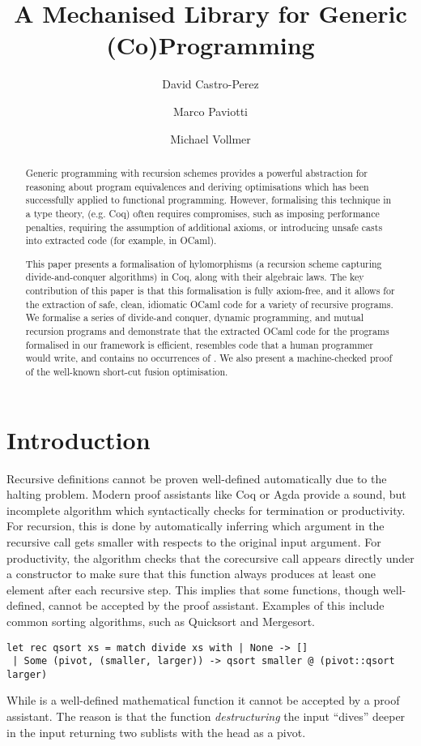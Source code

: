 \documentclass[anonymous, a4paper, UKenglish, cleveref, autoref, thm-restate]{lipics-v2021}
\title{A Mechanised Library for Generic (Co)Programming}
\author{David Castro-Perez}{School of Computing, University of Kent}{d-castro-perez@kent.ac.uk}{}{}
\author{Marco Paviotti}{School of Computing, University of Kent}{m.paviotti@kent.ac.uk}{}{}
\author{Michael Vollmer}{School of Computing, University of Kent}{m.vollmer@kent.ac.uk}{}{}
\begin{document}
\maketitle

\begin{abstract}
  Generic programming with recursion schemes provides a powerful abstraction
  for reasoning about program equivalences and deriving optimisations which has
  been successfully applied to functional programming. However, formalising
  this technique in a type theory, (e.g. Coq) often requires compromises, such
  as imposing performance penalties, requiring the assumption of additional
  axioms, or introducing unsafe casts into extracted code (for example,
   in OCaml).

  This paper presents a formalisation of hylomorphisms (a recursion scheme
  capturing divide-and-conquer algorithms) in Coq, along with their algebraic
  laws. The key contribution of this paper is that this formalisation is fully
  axiom-free, and it allows for the extraction of safe, clean, idiomatic OCaml
  code for a variety of recursive programs. We formalise a series of divide-and
  conquer, dynamic programming, and mutual recursion programs and demonstrate
  that the extracted OCaml code for the programs formalised in our framework is
  efficient, resembles code that a human programmer would write, and contains
  no occurrences of . We also present a machine-checked proof
  of the well-known short-cut fusion optimisation.
\end{abstract}

\section{Introduction}
\label{sec:intro}
Recursive definitions cannot be proven well-defined automatically due to the
halting problem. Modern proof assistants like Coq or Agda provide a sound, but
incomplete algorithm which syntactically checks for termination or
productivity.  For recursion, this is done by automatically inferring
which argument in the recursive call gets smaller with respects to the original
input argument.  For productivity, the algorithm checks that the corecursive
call appears directly under a constructor to make sure that this function
always produces at least one element after each recursive step.
This implies that some functions, though well-defined, cannot be accepted by
the proof assistant. Examples of this include common sorting algorithms, such
as Quicksort and Mergesort.
\begin{verbatim}
let rec qsort xs = match divide xs with | None -> []
 | Some (pivot, (smaller, larger)) -> qsort smaller @ (pivot::qsort larger)
\end{verbatim}
While  is a well-defined mathematical function it cannot be
accepted by a proof assistant.  The reason is that the 
function \emph{destructuring} the input ``dives'' deeper in the input returning
two sublists with the head as a pivot.
\end{document}

